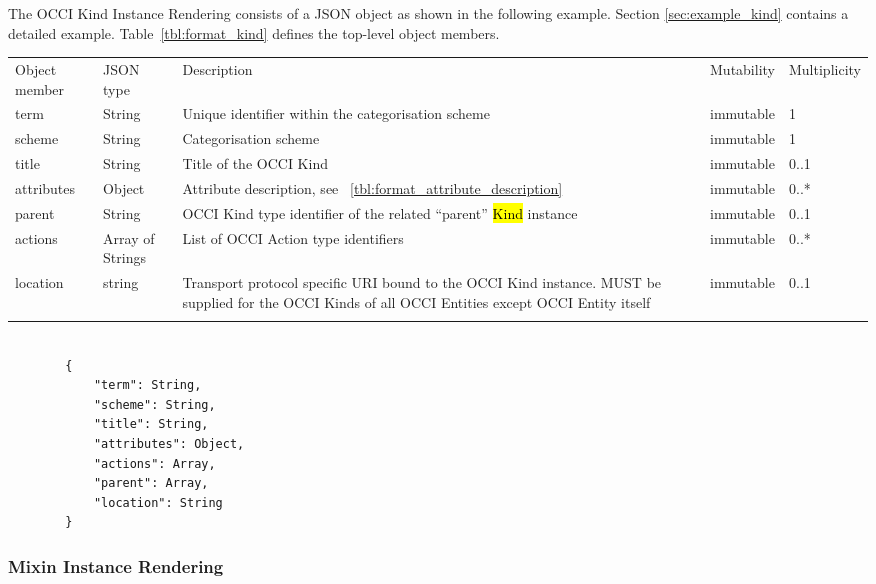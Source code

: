 \documentclass[10pt,a4paper]{article}
\begin{document}
The OCCI Kind Instance Rendering consists of a JSON object as shown in the
following example. Section \ref{sec:example_kind} contains a detailed example.
Table~\ref{tbl:format_kind} defines the top-level object members.

 {
    \begin{tabularx}{\textwidth}{llXll}
    \toprule
    Object member & JSON type & Description & Mutability & Multiplicity \\
    \colrule
    term & String & Unique identifier within the categorisation scheme &
immutable & 1 \\

    scheme & String & Categorisation scheme & immutable & 1 \\
    
    title & String & Title of the OCCI Kind & immutable & 0..1 \\
    
    attributes & Object & Attribute description, see
~\ref{tbl:format_attribute_description} & immutable & 0..* \\

    parent & String & OCCI Kind type identifier of the
related ``parent'' \hl{Kind} instance & immutable & 0..1 \\

    actions & Array of Strings & List of OCCI Action type
identifiers & immutable & 0..* \\

    location & string & Transport protocol specific URI bound to the OCCI Kind
instance. MUST be supplied for the OCCI Kinds of all OCCI Entities except OCCI
Entity itself & immutable & 0..1 \\
    \botrule
    \end{tabularx}
}

\begin{lstlisting}

        {
            "term": String,
            "scheme": String,
            "title": String,
            "attributes": Object,
            "actions": Array,
            "parent": Array,
            "location": String
        }

\end{lstlisting}

\subsubsection{Mixin Instance Rendering}
\label{sec:format_mixin}
\end{document}
